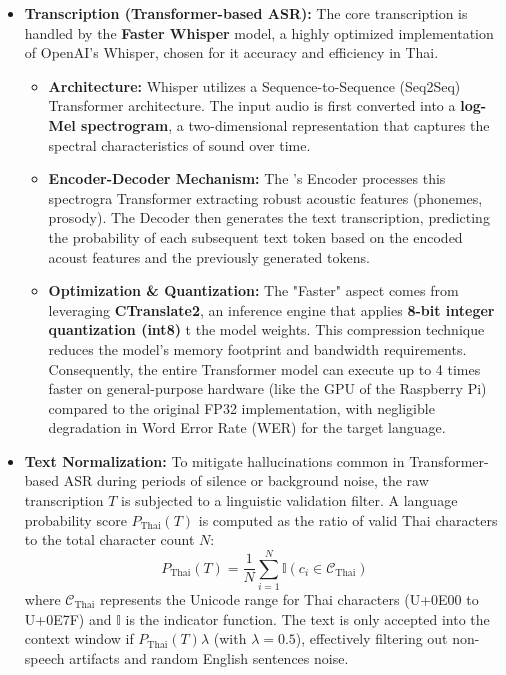 \begin{itemize}
	\item \textbf{Transcription (Transformer-based ASR):} The core transcription is handled by the 
	\textbf{Faster Whisper} model, a highly optimized implementation of OpenAI's Whisper, chosen for it
	accuracy and efficiency in Thai.
	\begin{itemize}
	\item \textbf{Architecture:} Whisper utilizes a Sequence-to-Sequence (Seq2Seq) Transformer 
	architecture. The input audio is first converted into a \textbf{log-Mel spectrogram}, a 
	two-dimensional representation that captures the spectral characteristics of sound over time.
	\item \textbf{Encoder-Decoder Mechanism:} The          's Encoder processes this spectrogra
	Transformer
	extracting robust acoustic features (phonemes, prosody). The Decoder then generates the text 
	transcription, predicting the probability of each subsequent text token based on the encoded acoust
	features and the previously generated tokens.
	\item \textbf{Optimization \& Quantization:} The "Faster" aspect comes from leveraging 
	\textbf{CTranslate2}, an inference engine that applies \textbf{8-bit integer quantization (int8)} t
	the model weights. This compression technique reduces the model's memory footprint and bandwidth 
	requirements. Consequently, the entire Transformer model can execute up to 4 times faster on 
	general-purpose hardware (like the GPU of the Raspberry Pi) compared to the original FP32 
	implementation, with negligible degradation in Word Error Rate (WER) for the target language.
	\end{itemize}
	\item \textbf{Text Normalization:} To mitigate hallucinations common in Transformer-based ASR during periods of 
	silence or background noise, the raw transcription $T$ is subjected to a linguistic validation filter. A language
	probability score $P_{\text{Thai}}(T)$ is computed as the ratio of valid Thai characters to the total character 
	count $N$:
	\begin{equation}
		P_{\text{Thai}}(T) = \frac{1}{N} \sum_{i=1}^{N} \mathbb{I}(c_i \in \mathcal{C}_{\text{Thai}})
	\end{equation}
	where $\mathcal{C}_{\text{Thai}}$ represents the Unicode range for Thai characters (U+0E00 to U+0E7F) and 
	$\mathbb{I}$ is the indicator function. The text is only accepted into the context window if $P_{\text{Thai}}(T) 
	\lambda$ (with $\lambda=0.5$), effectively filtering out non-speech artifacts and random English sentences noise.
\end{itemize}

